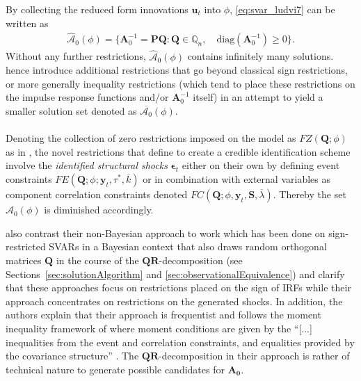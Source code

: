 \documentclass[a4paper,11pt,listof=nochaptergap,oneside,pointednumbers,bibtotoc,bigheadings,liststotoc,hidelinks]{scrbook}
\theoremstyle{mysatz}
\theoremstyle{mydefinition}
\theoremstyle{mytheorem}
\theoremstyle{mybemerkung}
\let\oldhat\hat
\newcommand{\vect}[1]{\boldsymbol{\mathbf{#1}}}
\newcommand{\hatt}[1]{\oldhat{\boldsymbol{\mathbf{#1}}}}
\begin{document}
By collecting the reduced form innovations $\vect{u}_t$ into $\phi$, \ref{eq:svar_ludvi7} can be written as 
\begin{equation} \label{eq:svar_ludvi8}
\begin{split}
 			\hatt{\mathcal{A}}_0(\phi) = \{\vect{A}_0^{-1} = \vect{P}\vect{Q}: \vect{Q} \in \mathbb{Q}_n, \quad \text{diag}(\vect{A}_0^{-1}) \geq 0\}.
\end{split}								
\end{equation}
Without any further restrictions, $\hatt{\mathcal{A}}_0(\phi)$ contains infinitely many solutions. \citet{ludvigsonetal:18} hence introduce additional restrictions that go beyond classical sign restrictions, or more generally inequality restrictions (which tend to place these restrictions on the impulse response functions and/or $\vect{A}_0^{-1}$ itself) in an attempt to yield a smaller solution set denoted as $\overline{\mathcal{A}_0}(\phi)$.\\
\\
Denoting the collection of zero restrictions imposed on the model as $FZ(\vect{Q}; \phi)$ as in \citet{rubioetal:10}, the novel restrictions that \citet{ludvigsonetal:18} define to create a credible identification scheme involve the \textit{identified structural shocks} $\vect{\epsilon}_t$ either on their own by defining event constraints $FE(\vect{Q}; \phi; \vect{y}_t, \tau^*, \overline{k})$ or in combination with external variables as component correlation constraints denoted $FC(\vect{Q}; \phi, \vect{y}_t, \vect{S}, \overline{\lambda})$. Thereby the set $\hatt{\mathcal{A}}_0(\phi)$ is diminished accordingly.

\citet{ludvigsonetal:18} also contrast their non-Bayesian approach to work which has been done on sign-restricted SVARs in a Bayesian context that also draws random orthogonal matrices $\vect{Q}$ in the course of the $\vect{QR}$-decomposition (see Sections~\ref{sec:solutionAlgorithm} and \ref{sec:observationalEquivalence}) and clarify that these approaches focus on restrictions placed on the sign of IRFs while their approach concentrates on restrictions on the generated shocks. In addition, the authors explain that their approach is frequentist and follows the moment inequality framework of \citet{andrewsandsoares:10} where moment conditions are given by the ``[...] inequalities from the event and correlation constraints, and equalities provided by the covariance structure'' \citet[p. 11]{ludvigsonetal:18}. The $\vect{QR}$-decomposition in their approach is rather of technical nature to generate possible candidates for $\vect{A_0}$.
\end{document}
